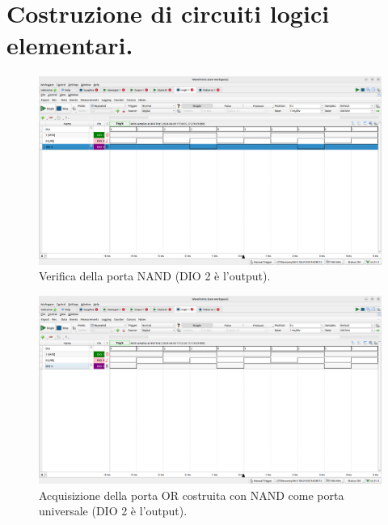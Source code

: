 \documentclass[10pt,a4paper]{article}
\begin{document}
\section{Costruzione di circuiti logici elementari.}
\begin{figure}[htp]
    \begin{center}
    \includegraphics[scale=0.25]{fig4.png}
    \caption{Verifica della porta NAND (DIO 2 è l'output).}
    \label{fig4}
    \end{center}
\end{figure}

\begin{figure}[htp]
    \begin{center}
    \includegraphics[scale=0.25]{fig5.png}
    \caption{Acquisizione della porta OR costruita con NAND come porta universale (DIO 2 è l'output).}
    \label{fig5}
    \end{center}
\end{figure}
\end{document}
